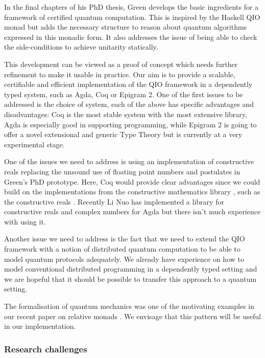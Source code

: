 \documentclass[a4paper]{article}
\begin{document}
In the final chapters of his PhD thesis, Green develops the basic
ingredients for a framework of certified quantum computation. This is
inspired by the Haskell QIO monad but adds the necessary structure to
reason about quantum algorithms expressed in this monadic form. It
also addresses the issue of being able to check the side-conditions to
achieve unitarity statically.

This development can be viewed as a proof of concept which needs
further refinement to make it usable in practice. Our aim is to
provide a scalable, certifiable and efficient implementation of the QIO
framework in a dependently typed system, such as Agda, Coq or Epigram
2.  One of the first issues to be addressed is the choice of system,
each of the above has specific advantages and disadvantages: Coq is
the most stable system with the most extensive library, Agda is
especially good in supporting programming, while Epigram 2 is going to
offer a novel extensional and generic Type Theory but is currently at
a very experimental stage.

One of the issues we need to address is using an implementation of
constructive reals replacing the unsound use of floating point numbers
and postulates in Green's PhD prototype. Here, Coq would provide clear
advantages since we could build on the implementations from the
constructive mathematics library , such as the constructive
reals . 
Recently Li Nuo has implemented a
library for constructive reals and complex numbers for Agda
but there isn't much experience with using it.

Another issue we need to address is the fact that we need to extend
the QIO framework with a notion of distributed quantum computation to be
able to model quantum protocols adequately. We already have experience
on how to model conventional distributed programming in a dependently
typed setting  and we are hopeful that it should be possible to
transfer this approach to a quantum setting.

The formalisation of quantum mechanics was one of the motivating
examples in our recent paper on relative monads .
We envisage that this pattern will be useful in our implementation.

\subsubsection*{Research challenges}
\label{sec:rsearch-challenges}
\end{document}
